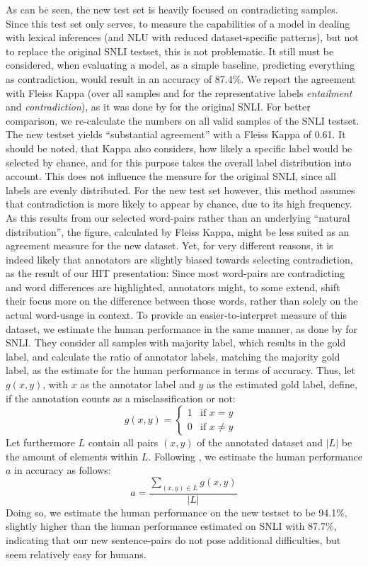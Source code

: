 As can be seen, the new test set is heavily focused on contradicting samples. Since this test set only serves, to measure the capabilities of a model in dealing with lexical inferences (and \ac{NLU} with reduced dataset-specific patterns), but not to replace the original \ac{SNLI} testset, this is not problematic. It still must be considered, when evaluating a model, as a simple baseline, predicting everything as contradiction, would result in an accuracy of 87.4\%. We report the agreement with Fleiss Kappa \citep{landis1977measurement} (over all samples and for the representative labels \textit{entailment} and \textit{contradiction}), as it was done by \cite{bowman2015large} for the original \ac{SNLI}. For better comparison, we re-calculate the numbers on all valid samples of the \ac{SNLI} testset. The new testset yields ``substantial agreement'' with a Fleiss Kappa of 0.61. It should be noted, that Kappa also considers, how likely a specific label would be selected by chance, and for this purpose takes the overall label distribution into account. This does not influence the measure for the original \ac{SNLI}, since all labels are evenly distributed. For the new test set however, this method assumes that contradiction is more likely to appear by chance, due to its high frequency. As this results from our selected word-pairs rather than an underlying ``natural distribution'', the figure, calculated by Fleiss Kappa, might be less suited as an agreement measure for the new dataset. Yet, for very different reasons, it is indeed likely that annotators are slightly biased towards selecting contradiction, as the result of our \ac{HIT} presentation: Since most word-pairs are contradicting and word differences are highlighted, annotators might, to some extend, shift their focus more on the difference between those words, rather than solely on the actual word-usage in context. To provide an easier-to-interpret measure of this dataset, we estimate the human performance in the same manner, as done by \cite{gong2017natural} for \ac{SNLI}. They consider all samples with majority label, which results in the gold label, and calculate the ratio of annotator labels, matching the majority gold label, as the estimate for the human performance in terms of accuracy. Thus, let $g(x,y)$, with $x$ as the annotator label and $y$ as the estimated gold label, define, if the annotation counts as a misclassification or not:
\begin{equation}
g(x,y) = \begin{cases}
1 & \text{if $x = y$} \\
0 & \text{if $x \neq y$ }
\end{cases}
\end{equation}
Let furthermore $L$ contain all pairs $(x,y)$ of the annotated dataset and $|L|$ be the amount of elements within $L$. Following \cite{gong2017natural}, we estimate the human performance $a$ in accuracy as follows:
\begin{equation}
a = \frac{\sum_{(x,y) \in L} g(x,y)}{|L|}
\end{equation}
Doing so, we estimate the human performance on the new testset to be 94.1\%, slightly higher than the human performance estimated on \ac{SNLI} with 87.7\%, indicating that our new sentence-pairs do not pose additional difficulties, but seem relatively easy for humans.
